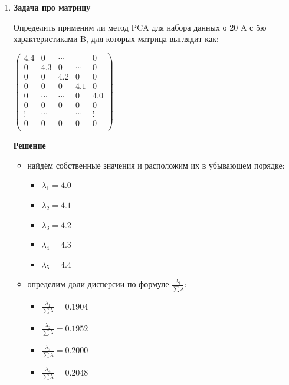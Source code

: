 \begin{enumerate}
    \item \textbf{Задача про матрицу} \par
    Определить применим ли метод PCA для набора данных о 20 A  с 5ю характеристиками B, для которых матрица выглядит как:\par
     $\begin{pmatrix}
      4.4 &  0 & \cdots &  & 0 \\
      0  & 4.3 & 0 & \cdots &  0   \\
      0  & 0 & 4.2 & 0 & 0      \\
      0  & 0 & 0 & 4.1 & 0     \\
      0  & \cdots & \cdots & 0 & 4.0     \\
      0 & 0 & 0 & 0 & 0\\
      \vdots & \cdots & & \cdots &\vdots \\
      0 & 0 & 0 & 0 & 0\\
     \end{pmatrix}$ \par
     \textbf{Решение} \par
     \begin{itemize}
        \item найдём собственные значения и расположим их в убывающем порядке:\par
            \begin{itemize}
            \item $\lambda_{1}  = 4.0$
            \item $\lambda_{2}  = 4.1$
            \item $\lambda_{3}  = 4.2$
            \item $\lambda_{4}  = 4.3$
            \item $\lambda_{5}  = 4.4$
            \end{itemize}
        \item определим доли дисперсии по формуле $\frac{ \lambda_i }{\sum \lambda}$: \par
                \begin{itemize}
                \item $\frac{ \lambda_1 }{\sum \lambda}  = 0.1904$
                \item $\frac{ \lambda_2 }{\sum \lambda}  = 0.1952$
                \item $\frac{ \lambda_3 }{\sum \lambda}  = 0.2000$
                \item $\frac{ \lambda_4 }{\sum \lambda}  = 0.2048$

\end{itemize}
\end{itemize}
\end{enumerate}
